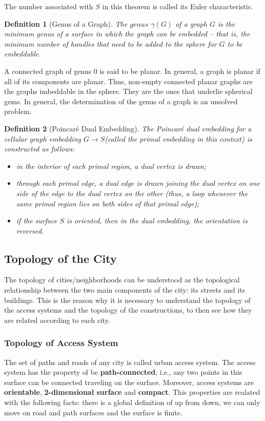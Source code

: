 \documentclass[10pt]{article}
\newtheorem{definition}{Definition}
\begin{document}
The number associated with $S$ in this theorem is called its Euler characteristic.

\begin{definition} [Genus of a Graph]
The $genus$ $\gamma(G)$ of a graph $G$ is the minimum genus of a surface in which the graph can be embedded – that is, the minimum number of handles that need to be added to the sphere for $G$ to be embeddable.
\end{definition}

A connected graph of genus 0 is said to be planar. In general, a graph is planar if all of its components are planar. Thus, non-empty connected planar graphs are the graphs imbeddable in the sphere. They are the ones that underlie spherical gems. In general, the determination of the genus of a graph is  an unsolved problem. 


\begin{definition}[Poincar\'e Dual Embedding]
The \emph{Poincar\'e dual embedding} for a cellular graph embedding $G\xrightarrow{}S$(called \emph{the primal embedding} in this context) is constructed as follows:
    \begin{itemize}
        \item in the interior of each primal region, a \emph{dual vertex} is drawn;
        \item through each primal edge, a \emph{dual edge} is drawn joining the dual vertex on one side of the edge to the dual vertex on the other (thus, a loop whenever the same primal region lies on both sides of that primal edge);
        \item if the surface $S$ is oriented, then in the dual embedding, the orientation is reversed.
    \end{itemize}
\end{definition}

\subsection{Topology of the City}
The topology of cities/neighborhoods can be understood as the topological relationship between the two main components of the city: its streets and its buildings. This is the reason why it is necessary to understand the topology of the access systems and the topology of the constructions, to then see how they are related according to each city.

\subsubsection{Topology of Access System}
The set of paths and roads of any city is called urban access system. The access system has the property of be \textbf{path-connected}, i.e., any two points in this surface can be connected traveling on the surface. Moreover, access systems are \textbf{orientable}, \textbf{2-dimensional surface} and \textbf{compact}. This properties are realated with the following facts: there is a global definition of up from down, we can only move on road and path surfaces and the surface is finite.\\
\end{document}

